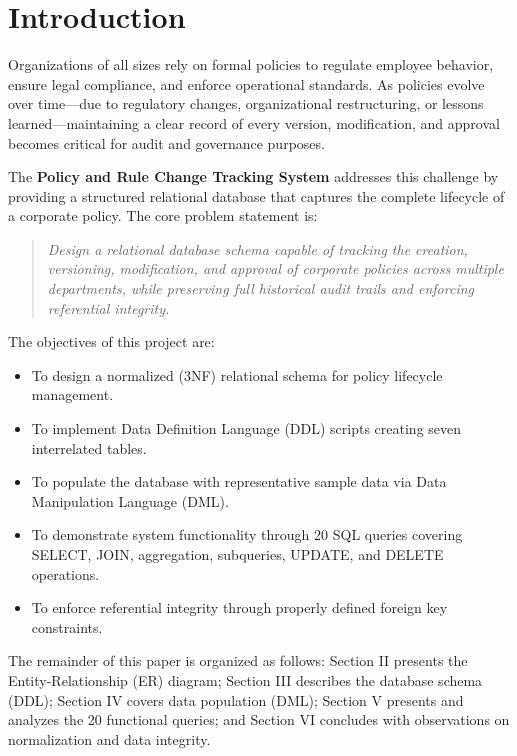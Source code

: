 \documentclass[conference]{IEEEtran}
\begin{document}
\section{Introduction}

Organizations of all sizes rely on formal policies to regulate employee behavior, ensure legal compliance, and enforce operational standards. As policies evolve over time—due to regulatory changes, organizational restructuring, or lessons learned—maintaining a clear record of every version, modification, and approval becomes critical for audit and governance purposes.

The \textbf{Policy and Rule Change Tracking System} addresses this challenge by providing a structured relational database that captures the complete lifecycle of a corporate policy. The core problem statement is:

\begin{quote}
\textit{Design a relational database schema capable of tracking the creation, versioning, modification, and approval of corporate policies across multiple departments, while preserving full historical audit trails and enforcing referential integrity.}
\end{quote}

The objectives of this project are:
\begin{itemize}
  \item To design a normalized (3NF) relational schema for policy lifecycle management.
  \item To implement Data Definition Language (DDL) scripts creating seven interrelated tables.
  \item To populate the database with representative sample data via Data Manipulation Language (DML).
  \item To demonstrate system functionality through 20 SQL queries covering SELECT, JOIN, aggregation, subqueries, UPDATE, and DELETE operations.
  \item To enforce referential integrity through properly defined foreign key constraints.
\end{itemize}

The remainder of this paper is organized as follows: Section II presents the Entity-Relationship (ER) diagram; Section III describes the database schema (DDL); Section IV covers data population (DML); Section V presents and analyzes the 20 functional queries; and Section VI concludes with observations on normalization and data integrity.
\end{document}
